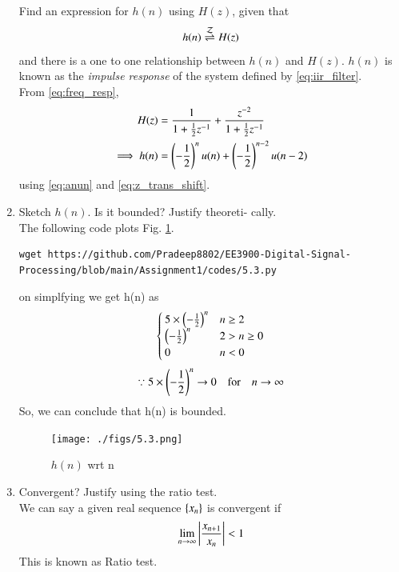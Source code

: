 \documentclass[journal,12pt,twocolumn]{IEEEtran}
\renewcommand\thesection{\arabic{section}}
\begin{document}
\begin{enumerate}[label=\thesection.\arabic*]
	Find an expression for $h(n)$ using $H(z)$, given that 
	\begin{equation}
		\label{eq:impulse_resp}
		h(n) \overset{\mathcal{Z}}{ \rightleftharpoons} H(z)
	\end{equation}
	and there is a one to one relationship between $h(n)$ and $H(z)$. $h(n)$ is known as the {\em impulse response} of the
	system defined by \eqref{eq:iir_filter}.
	\\
	\solution From \eqref{eq:freq_resp},
	\begin{align}
		H(z) &= \frac{1}{1 + \frac{1}{2}z^{-1}} + \frac{ z^{-2}}{1 + \frac{1}{2}z^{-1}}
		\\
		\implies h(n) &= \left(-\frac{1}{2}\right)^{n}u(n) + \left(-\frac{1}{2}\right)^{n-2}u(n-2)
	\end{align}
	using \eqref{eq:anun} and \eqref{eq:z_trans_shift}.
	\item Sketch $h(n)$. Is it bounded? Justify theoreti-
	cally.
	\\
	\solution The following code plots Fig. \ref{fig:5.3}.
	\begin{lstlisting}
wget https://github.com/Pradeep8802/EE3900-Digital-Signal-Processing/blob/main/Assignment1/codes/5.3.py
	\end{lstlisting}
	on simplfying we get h(n) as
	\begin{align}
		\begin{cases}
			5\times \left(-\frac{1}{2}\right)^n  & n\geq 2\\
			\left(-\frac{1}{2}\right)^n  &2>n\geq0\\
			0 &n<0
		\end{cases}
	\end{align}
	\begin{align}
		\because 5\times \left(-\frac{1}{2}\right)^n \to 0 \quad	\text{for} \quad n\to \infty 
	\end{align}
	So, we can conclude that h(n) is bounded.
	\begin{figure}[!ht]
		\centering
		\texttt{[image: ./figs/5.3.png]}
		\caption{$h(n)$ wrt n}
		\label{fig:5.3}
	\end{figure}
     \item Convergent? Justify using the ratio test.\\
\solution We can say a given real sequence $\left\{x_n\right\}$ is convergent if 
\begin{align}
	\lim_{n \rightarrow \infty}\left\vert\frac{x_{n+1}}{x_n}\right\vert < 1
\end{align}
This is known as Ratio test.\\

\end{enumerate}
\end{document}
